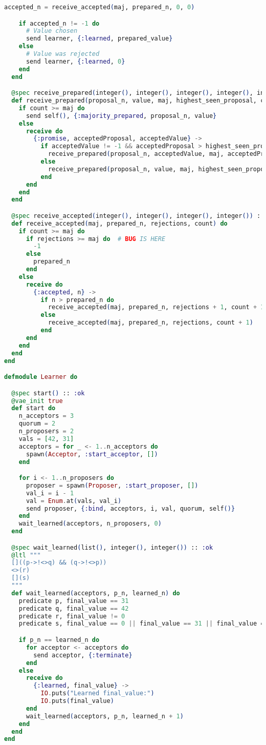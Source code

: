 \begin{lstlisting}[language=Elixir, xleftmargin=.1\linewidth]
    accepted_n = receive_accepted(maj, prepared_n, 0, 0)

    if accepted_n != -1 do
      # Value chosen
      send learner, {:learned, prepared_value}
    else
      # Value was rejected
      send learner, {:learned, 0}
    end
  end

  @spec receive_prepared(integer(), integer(), integer(), integer(), integer()) :: :ok
  def receive_prepared(proposal_n, value, maj, highest_seen_proposal, count) do
    if count >= maj do
      send self(), {:majority_prepared, proposal_n, value}
    else
      receive do
        {:promise, acceptedProposal, acceptedValue} ->
          if acceptedValue != -1 && acceptedProposal > highest_seen_proposal do
            receive_prepared(proposal_n, acceptedValue, maj, acceptedProposal, count + 1)
          else
            receive_prepared(proposal_n, value, maj, highest_seen_proposal, count + 1)
          end
      end
    end
  end

  @spec receive_accepted(integer(), integer(), integer(), integer()) :: integer()
  def receive_accepted(maj, prepared_n, rejections, count) do
    if count >= maj do
      if rejections >= maj do  # BUG IS HERE
        -1
      else
        prepared_n
      end
    else
      receive do
        {:accepted, n} ->
          if n > prepared_n do
            receive_accepted(maj, prepared_n, rejections + 1, count + 1)
          else
            receive_accepted(maj, prepared_n, rejections, count + 1)
          end
      end
    end
  end
end

defmodule Learner do

  @spec start() :: :ok
  @vae_init true
  def start do
    n_acceptors = 3
    quorum = 2
    n_proposers = 2
    vals = [42, 31]
    acceptors = for _ <- 1..n_acceptors do
      spawn(Acceptor, :start_acceptor, [])
    end

    for i <- 1..n_proposers do
      proposer = spawn(Proposer, :start_proposer, [])
      val_i = i - 1
      val = Enum.at(vals, val_i)
      send proposer, {:bind, acceptors, i, val, quorum, self()}
    end
    wait_learned(acceptors, n_proposers, 0)
  end

  @spec wait_learned(list(), integer(), integer()) :: :ok
  @ltl """
  []((p->!<>q) && (q->!<>p))
  <>(r)
  [](s)
  """
  def wait_learned(acceptors, p_n, learned_n) do
    predicate p, final_value == 31
    predicate q, final_value == 42
    predicate r, final_value != 0
    predicate s, final_value == 0 || final_value == 31 || final_value == 42

    if p_n == learned_n do
      for acceptor <- acceptors do
        send acceptor, {:terminate}
      end
    else
      receive do
        {:learned, final_value} ->
          IO.puts("Learned final_value:")
          IO.puts(final_value)
      end
      wait_learned(acceptors, p_n, learned_n + 1)
    end
  end
end

\end{lstlisting}

